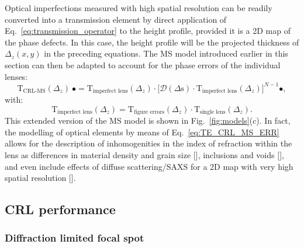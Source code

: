 \begin{refsection}
Optical imperfections measured with high spatial resolution can be readily converted into a transmission element by direct application of Eq.~\ref{eq:transmission_operator} to the height profile, provided it is a 2D map of the phase defects. In this case, the height profile will be the projected thickness of $\Delta_z(x,y)$ in the preceding equations. The MS model introduced earlier in this section can then be adapted to account for the phase errors of the individual lenses:
\begin{equation}\label{eq:TE_CRL_MS_ERR}
    \mathrm{T}_{\text{CRL-MS}}(\Delta_z)~\bullet = \mathrm{T}_{\text{imperfect lens}}(\Delta_z)\cdot\big[\mathcal{D}({\Delta}\text{s})\cdot\mathrm{T}_{\text{imperfect lens}}(\Delta_z)\big]^{N-1}\bullet,
\end{equation}{}
with:
\begin{equation}
    \mathrm{T}_{\text{imperfect lens}}(\Delta_z) = \mathrm{T}_{\text{figure errors}}(\Delta_z)\cdot\mathrm{T}_{\text{single lens}}(\Delta_z).
\end{equation}{}
This extended version of the MS model is shown in Fig.~\ref{fig:models}(c). In fact, the modelling of optical elements by means of  Eq.~\ref{eq:TE_CRL_MS_ERR} allows for the description of inhomogenities in the index of refraction within the lens as differences in material density and grain size [\cite{Lyatun2020}], inclusions and voids [\cite{Roth2014}], and even include effects of diffuse scattering/SAXS for a 2D map with very high spatial resolution [\cite{Paganin2019}].

\subsection{CRL performance}\label{sec:CRL_performance}

\subsubsection*{Diffraction limited focal spot}


\end{refsection}
